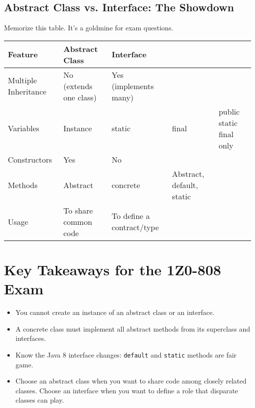 \documentclass[12pt]{article}
\begin{document}
\begin{enumerate}[label=(\arabic*)]
\subsection*{Abstract Class vs. Interface: The Showdown}
Memorize this table. It's a goldmine for exam questions.
\begin{tabular}{|l|l|l|}
\hline
\textbf{Feature} & \textbf{Abstract Class} & \textbf{Interface} \\
\hline
Multiple Inheritance & No (extends one class) & Yes (implements many) \\
\hline
Variables & Instance & static & final & public static final only \\
\hline
Constructors & Yes & No \\
\hline
Methods & Abstract & concrete & Abstract, default, static \\
\hline
Usage & To share common code & To define a contract/type \\
\hline
\end{tabular}

\section*{Key Takeaways for the 1Z0-808 Exam}
\begin{itemize}
    \item You cannot create an instance of an abstract class or an interface.
    \item A concrete class must implement all abstract methods from its superclass and interfaces.
    \item Know the Java 8 interface changes: \texttt{default} and \texttt{static} methods are fair game.
    \item Choose an abstract class when you want to share code among closely related classes. Choose an interface when you want to define a role that disparate classes can play.
\end{itemize}
\end{enumerate}
\end{document}
